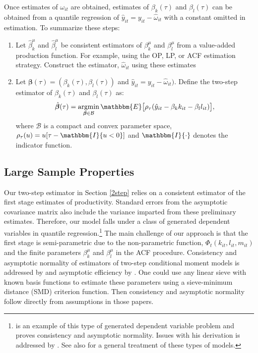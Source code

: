 \documentclass[11pt]{article}
\begin{document}
Once estimates of $\omega_{it}$ are obtained, estimates of $\beta_{k}(\tau)$ and $\beta_{l}(\tau)$
can be obtained from a quantile regression of $\hat{y}_{it}=y_{it}-\hat{\omega}_{it}$ with a constant omitted in estimation. To summarize these steps:
\begin{enumerate}
	\item Let $\hat{\beta}_{k}^{\mu}$ and $\hat{\beta}_{l}^{\mu}$ be consistent estimators of $\beta_{k}^{\mu}$ and $\beta_{l}^{\mu}$ from a value-added production function. For example, using the OP, LP, or ACF estimation strategy. Construct the estimator, $\hat{\omega}_{it}$ using these estimates
	\item Let $\boldsymbol{\beta}(\tau)=(\beta_{k}(\tau), \beta_{l}(\tau))$ and $\hat{y}_{it}=y_{it}-\hat{\omega}_{it})$. Define the two-step estimator of $\beta_{k}(\tau)$ and $\beta_{l}(\tau)$ as:
	\begin{equation*}
	\hat{\boldsymbol{\beta}}(\tau)=\underset{\boldsymbol{\beta}\in\mathcal{B}}{\operatorname{argmin}}\, \mathbbm{E}\big[\rho_{\tau}(\hat{y}_{it}-\beta_{k}k_{it}-\beta_{l}l_{it})\big],
	\end{equation*}
	where $\mathcal{B}$ is a compact and convex parameter space, $\rho_{\tau}(u)=u[\tau-\mathbbm{I}\{u<0\}]$ and $\mathbbm{I}\{\cdot\}$ denotes the indicator function.
\end{enumerate}
\subsection{Large Sample Properties}
Our two-step estimator in Section \ref{2step} relies on a consistent estimator of the first stage estimates of productivity. Standard errors from the asymptotic covariance matrix also include the variance imparted from these preliminary estimates. Therefore, our model falls under a class of generated dependent variables in quantile regression.\footnote{\cite{Canay2011} is an example of this type of generated dependent variable problem and proves consistency and asymptotic normality. Issues with his derivation is addressed by \cite{Besstremyannaya2019}. See also \cite{bhat2019} for a general treatment of these types of models.} The main challenge of our approach is that the first stage is semi-parametric due to the non-parametric function, $\Phi_{t}(k_{it}, l_{it}, m_{it})$ and the finite parameters $\beta_{k}^{\mu}$ and $\beta_{l}^{\mu}$ in the ACF procedure. Consistency and asymptotic normality of estimators of two-step conditional moment models is addressed by \cite{Newey2003} and asymptotic efficiency by \cite{Ai2003}. One could use any linear sieve with known basis functions to estimate these parameters using a sieve-minimum distance (SMD) criterion function. Then consistency and asymptotic normality follow directly from assumptions in those papers. 
\end{document}
